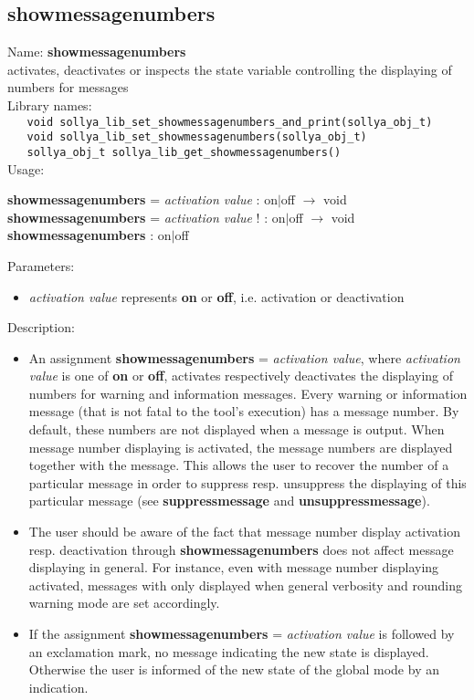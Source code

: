 \subsection{showmessagenumbers}
\label{labshowmessagenumbers}
\noindent Name: \textbf{showmessagenumbers}\\
\phantom{aaa}activates, deactivates or inspects the state variable controlling the displaying of numbers for messages\\[0.2cm]
\noindent Library names:\\
\verb|   void sollya_lib_set_showmessagenumbers_and_print(sollya_obj_t)|\\
\verb|   void sollya_lib_set_showmessagenumbers(sollya_obj_t)|\\
\verb|   sollya_obj_t sollya_lib_get_showmessagenumbers()|\\[0.2cm]
\noindent Usage: 
\begin{center}
\textbf{showmessagenumbers} = \emph{activation value} : \textsf{on$|$off} $\rightarrow$ \textsf{void}\\
\textbf{showmessagenumbers} = \emph{activation value} ! : \textsf{on$|$off} $\rightarrow$ \textsf{void}\\
\textbf{showmessagenumbers} : \textsf{on$|$off}\\
\end{center}
Parameters: 
\begin{itemize}
\item \emph{activation value} represents \textbf{on} or \textbf{off}, i.e. activation or deactivation
\end{itemize}
\noindent Description: \begin{itemize}

\item An assignment \textbf{showmessagenumbers} = \emph{activation value}, where \emph{activation value}
   is one of \textbf{on} or \textbf{off}, activates respectively deactivates the
   displaying of numbers for warning and information messages. Every
   \sollya warning or information message (that is not fatal to the
   tool's execution) has a message number. By default, these numbers are
   not displayed when a message is output. When message number displaying
   is activated, the message numbers are displayed together with the
   message. This allows the user to recover the number of a particular
   message in order to suppress resp. unsuppress the displaying of this
   particular message (see \textbf{suppressmessage} and \textbf{unsuppressmessage}).

\item The user should be aware of the fact that message number display
   activation resp. deactivation through \textbf{showmessagenumbers} does not affect message
   displaying in general. For instance, even with message number
   displaying activated, messages with only displayed when general
   verbosity and rounding warning mode are set accordingly.

\item If the assignment \textbf{showmessagenumbers} = \emph{activation value} is followed by an
   exclamation mark, no message indicating the new state is
   displayed. Otherwise the user is informed of the new state of the
   global mode by an indication.
\end{itemize}
